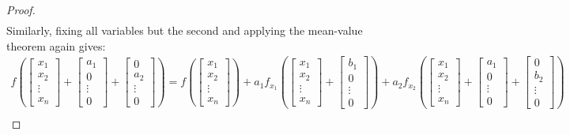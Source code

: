 \documentclass{article}
\theoremstyle{definition}
\begin{document}
\begin{proof}
\begin{align*}
	\end{align*}
	Similarly, fixing all variables but the second and applying the mean-value theorem again gives:
	\begin{align*}
		f\left(\begin{bmatrix}x_1\\x_2\\\vdots\\x_n\end{bmatrix}+\begin{bmatrix}a_1\\0\\\vdots\\0\end{bmatrix}+\begin{bmatrix}0\\a_2\\\vdots\\0\end{bmatrix}\right)=f\left(\begin{bmatrix}x_1\\x_2\\\vdots\\x_n\end{bmatrix}\right)+a_1f_{x_1}\left(\begin{bmatrix}x_1\\x_2\\\vdots\\x_n\end{bmatrix}+\begin{bmatrix}b_1\\0\\\vdots\\0\end{bmatrix}\right)+a_2f_{x_2}\left(\begin{bmatrix}x_1\\x_2\\\vdots\\x_n\end{bmatrix}+\begin{bmatrix}a_1\\0\\\vdots\\0\end{bmatrix}+\begin{bmatrix}0\\b_2\\\vdots\\0\end{bmatrix}\right)\\
	\end{align*}

\end{proof}
\end{document}
